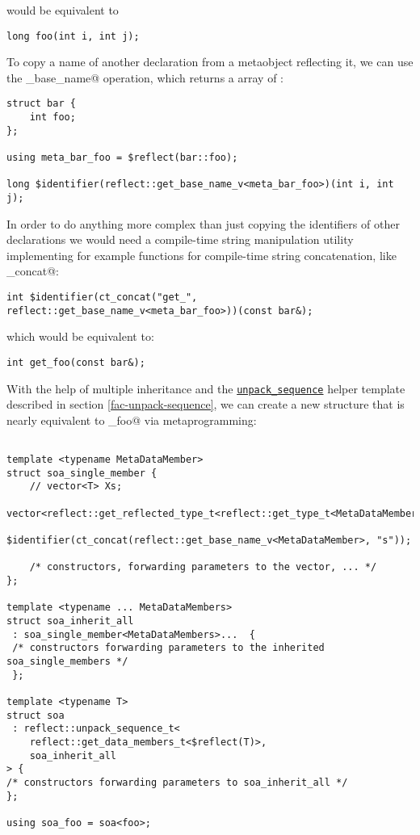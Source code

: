 would be equivalent to 

\begin{verbatim}
long foo(int i, int j);
\end{verbatim}

To copy a name of another declaration from a metaobject reflecting it,
we can use the \verb@get_base_name@ operation, which returns a \verb@constexpr@
array of \verb@char@s:

\begin{verbatim}
struct bar {
	int foo;
};

using meta_bar_foo = $reflect(bar::foo);

long $identifier(reflect::get_base_name_v<meta_bar_foo>)(int i, int j);
\end{verbatim}

In order to do anything more complex than just
copying the identifiers of other declarations we would need a compile-time
string manipulation utility implementing for example functions for
compile-time string concatenation, like \verb@ct_concat@:

\begin{verbatim}
int $identifier(ct_concat("get_", reflect::get_base_name_v<meta_bar_foo>))(const bar&);
\end{verbatim}

which would be equivalent to:

\begin{verbatim}
int get_foo(const bar&);
\end{verbatim}

With the help of multiple inheritance and the
\hyperref[fac-unpack-sequence]{\texttt{unpack\_sequence}} helper template described
in section \ref{fac-unpack-sequence}, we can create a new structure that is
nearly equivalent to \verb@soa_foo@ via metaprogramming:

\begin{verbatim}

template <typename MetaDataMember>
struct soa_single_member {
	// vector<T> Xs;
	vector<reflect::get_reflected_type_t<reflect::get_type_t<MetaDataMember>>>
		$identifier(ct_concat(reflect::get_base_name_v<MetaDataMember>, "s"));

	/* constructors, forwarding parameters to the vector, ... */
};

template <typename ... MetaDataMembers>
struct soa_inherit_all
 : soa_single_member<MetaDataMembers>...  {
 /* constructors forwarding parameters to the inherited soa_single_members */
 };

template <typename T>
struct soa
 : reflect::unpack_sequence_t<
	reflect::get_data_members_t<$reflect(T)>,
	soa_inherit_all
> {
/* constructors forwarding parameters to soa_inherit_all */
};

using soa_foo = soa<foo>;
\end{verbatim}

